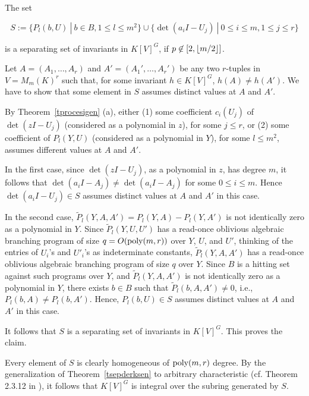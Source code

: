 \documentclass[11pt]{article}
\begin{document}
\begin{claim} \label{cSpos}
The set 

\begin{equation}
S :=\{P_l(b,U) \ | \  b \in B, 1 \le l \le m^2 \} \cup \{ \det(a_i I - U_j) \ |  \ 0 \le i \le m, 1 \le j \le r \}
\end{equation} 

is a separating set of invariants in $K[V]^G$, if $p \not \in [2,{\lfloor m/2 \rfloor}]$.
\end{claim} 

Let  $A=(A_1,\ldots,A_r)$ and $A'=(A_1',\ldots,A_r')$ be any  two $r$-tuples in
$V=M_m(K)^r$ such that,
for some invariant $h \in K[V]^G$, $h(A) \not = h(A')$. We have to show that
some element in $S$ assumes distinct values at $A$ and $A'$.

By Theorem~\ref{tprocesigen} (a), 
either (1) some
coefficient $c_i(U_j)$ 
of $\det(z I - U_j)$ (considered as a polynomial in $z$), for some $j \le r$, 
or (2) some coefficient of  $P_l(Y,U)$ (considered as a polynomial in $Y$), for some $l \le m^2$, 
assumes different values at $A$ and $A'$. 


In the first case, since $\det(z I - U_j)$,
as a polynomial in $z$, has degree $m$, it follows that
$\det(a_i I - A_j) \not = \det(a_i I - A_j)$ for some $0 \le i \le m$. Hence 
$\det(a_i I - U_j) \in S$ assumes distinct values at  $A$ and $A'$ in this case.

In the second case,  $\tilde P_l(Y,A,A')=P_l(Y,A)-P_l(Y,A')$
is not identically zero as a polynomial in $Y$.
Since $\tilde P_l(Y,U,U')$ has a read-once oblivious algebraic branching program 
of size $q=O({\mbox {poly}}(m,r))$  over $Y$, $U$, and $U'$, thinking of the entries
of $U_i$'s and $U'_i$'s as indeterminate constants, $\tilde P_l(Y,A,A')$ 
has a read-once oblivious algebraic branching program  of size $q$ over $Y$.
Since $B$ is a hitting set against such programs over $Y$,
 and $\tilde P_l(Y,A,A')$ is not identically zero as a polynomial in $Y$,
there exists $b \in B$ such that $\tilde P_l(b,A,A') \not = 0$, i.e.,
$P_l(b,A) \not = P_l(b,A')$. Hence, $P_l(b,U) \in S$ assumes distinct values at
$A$ and $A'$ in this case.

It follows that  $S$ is a separating set of invariants in $K[V]^G$.
This proves the claim.

Every element of $S$ is clearly homogeneous of ${\mbox {poly}}(m,r)$ degree.
By the generalization of Theorem~\ref{tsepderksen} to arbitrary characteristic (cf. Theorem 2.3.12
in \cite{derksenbook}), it follows that
$K[V]^G$ is integral over the subring generated by $S$.
\end{document}
